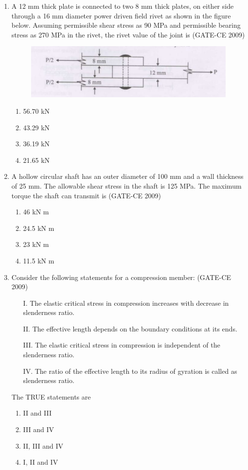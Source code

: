 \documentclass[journal,12pt,onecolumn]{article}
\theoremstyle{remark}
\begin{document}
\begin{enumerate}
    \item A 12 mm thick plate is connected to two 8 mm thick plates, on either side through a 16 mm diameter power driven field rivet as shown in the figure below. Assuming permissible shear stress as 90 MPa and permissible bearing stress as 270 MPa in the rivet, the rivet value of the joint is (GATE-CE 2009)
    \begin{figure}[H]
    \centering
    \includegraphics[width=0.7\columnwidth]{figs/image2.jpg}
    \label{fig:placeholder}
    \end{figure}
    
    \begin{enumerate}
        \item 56.70 kN 
        \item 43.29 kN
        \item 36.19 kN 
        \item 21.65 kN
    \end{enumerate}
    
    \item A hollow circular shaft has an outer diameter of 100 mm and a wall thickness of 25 mm. The allowable shear stress in the shaft is 125 MPa. The maximum torque the shaft can transmit is (GATE-CE 2009)
    \begin{enumerate}
        \item 46 kN m 
        \item 24.5 kN m 
        \item 23 kN m 
        \item 11.5 kN m
    \end{enumerate}
    
    \item Consider the following statements for a compression member: (GATE-CE 2009)
    \begin{itemize}
        \item[I.] The elastic critical stress in compression increases with decrease in slenderness ratio.
        \item[II.] The effective length depends on the boundary conditions at its ends.
        \item[III.] The elastic critical stress in compression is independent of the slenderness ratio.
        \item[IV.] The ratio of the effective length to its radius of gyration is called as slenderness ratio.
    \end{itemize}
    The TRUE statements are \\
    \begin{enumerate}
        \item II and III 
        \item III and IV 
        \item II, III and IV 
        \item I, II and IV
    \end{enumerate}
    

\end{enumerate}
\end{document}
